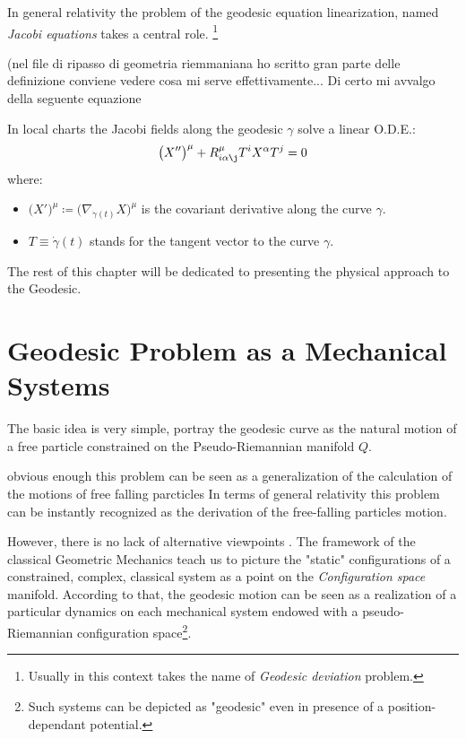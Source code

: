 \documentclass[Main]{subfiles}
\begin{document}
	In general relativity the problem of the geodesic equation linearization, named \emph{Jacobi equations} takes a central role. \footnote{Usually in this context takes the name of \emph{Geodesic deviation} problem\cite[pag. 46]{Wald1984}.}
	
\begin{Warning}
	(nel file di ripasso di geometria riemmaniana ho scritto gran parte delle definizione conviene vedere cosa mi serve effettivamente...
	Di certo mi avvalgo della seguente  equazione
\end{Warning}
	
	\begin{notationfix}
		In local charts the Jacobi fields along the geodesic $\gamma$ solve a linear O.D.E.:
		\begin{equation}\label{JacobiEquationComponents}
			\big( X''\big)^\mu + R^\mu_{i \alpha \j} T^i X^\alpha T^j =0
		\end{equation}
		where:
		\begin{itemize}
			\item $\big(X'\big)^\mu \coloneqq \big( \nabla_{\dot{\gamma}(t)} X\big)^\mu$ is the covariant derivative along the curve $\gamma$.
			\item $T \equiv \dot{\gamma}(t)$ stands for the tangent vector to the curve $\gamma$.
		\end{itemize}
	
	\end{notationfix}
	
	
	
	
	The rest of this chapter will be dedicated to presenting the physical approach to the Geodesic.


\section{Geodesic Problem as a Mechanical Systems}\label{GeodesicMechanics}
	The basic idea is very simple, portray the geodesic curve as the natural motion of a free particle constrained on the Pseudo-Riemannian manifold $Q$.
	
	\begin{Warning}
	obvious enough this problem can be seen as a generalization of the calculation of the motions of free falling parcticles
	In terms of general relativity this problem can be instantly recognized as the derivation of the free-falling particles motion.
	
	However, there is no lack of alternative viewpoints .
	The framework of the classical Geometric Mechanics teach us to picture the "static" configurations of a constrained, complex, classical system as a point on the \emph{Configuration space} manifold. According to that, the geodesic motion can be seen as a realization of a particular dynamics on each mechanical system endowed with a pseudo-Riemannian configuration space\footnote{Such systems can be depicted as "geodesic" even in presence of a position-dependant potential.\cite[Cap 3.7]{Abraham1978}}.
	\end{Warning}
\end{document}
